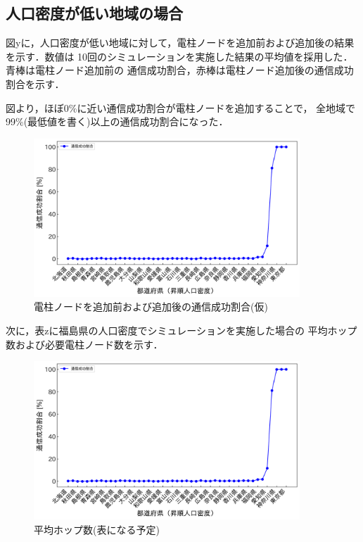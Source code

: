 \documentclass[a4paper, 11pt]{ltjsarticle}
\begin{document}

\subsection{人口密度が低い地域の場合}
図yに，人口密度が低い地域に対して，電柱ノードを追加前および追加後の結果を示す．数値は
10回のシミュレーションを実施した結果の平均値を採用した．青棒は電柱ノード追加前の
通信成功割合，赤棒は電柱ノード追加後の通信成功割合を示す．

図より，ほぼ0\%に近い通信成功割合が電柱ノードを追加することで，
全地域で99\%(最低値を書く)以上の通信成功割合になった．

\begin{figure}[h]
  \centering
  \includegraphics[width=100mm]{通信成功率グラフ.png}
  \caption{電柱ノードを追加前および追加後の通信成功割合(仮)}
  \label{figure:人口密度低い}
\end{figure}

次に，表zに福島県の人口密度でシミュレーションを実施した場合の
平均ホップ数および必要電柱ノード数を示す．

\begin{figure}
  \centering
  \includegraphics[width=100mm]{通信成功率グラフ.png}
  \caption{平均ホップ数(表になる予定)}
\end{figure}
\end{document}
